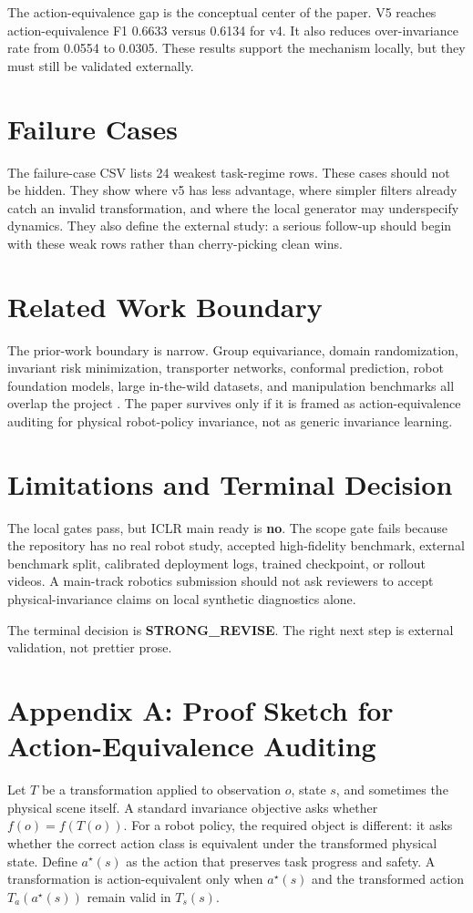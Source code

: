 \documentclass{article}
\begin{document}
The action-equivalence gap is the conceptual center of the paper. V5 reaches action-equivalence F1 0.6633 versus 0.6134 for v4. It also reduces over-invariance rate from 0.0554 to 0.0305. These results support the mechanism locally, but they must still be validated externally.

\section{Failure Cases}
The failure-case CSV lists 24 weakest task-regime rows. These cases should not be hidden. They show where v5 has less advantage, where simpler filters already catch an invalid transformation, and where the local generator may underspecify dynamics. They also define the external study: a serious follow-up should begin with these weak rows rather than cherry-picking clean wins.

\section{Related Work Boundary}
The prior-work boundary is narrow. Group equivariance, domain randomization, invariant risk minimization, transporter networks, conformal prediction, robot foundation models, large in-the-wild datasets, and manipulation benchmarks all overlap the project \citep{james2020rlbench,yu2020metaworld,ebert2021bridge}. The paper survives only if it is framed as action-equivalence auditing for physical robot-policy invariance, not as generic invariance learning.

\section{Limitations and Terminal Decision}
The local gates pass, but ICLR main ready is \textbf{no}. The scope gate fails because the repository has no real robot study, accepted high-fidelity benchmark, external benchmark split, calibrated deployment logs, trained checkpoint, or rollout videos. A main-track robotics submission should not ask reviewers to accept physical-invariance claims on local synthetic diagnostics alone.

The terminal decision is \textbf{STRONG\_REVISE}. The right next step is external validation, not prettier prose.

\clearpage

\section{Appendix A: Proof Sketch for Action-Equivalence Auditing}
Let $T$ be a transformation applied to observation $o$, state $s$, and sometimes the physical scene itself. A standard invariance objective asks whether $f(o)=f(T(o))$. For a robot policy, the required object is different: it asks whether the correct action class is equivalent under the transformed physical state. Define $a^\star(s)$ as the action that preserves task progress and safety. A transformation is action-equivalent only when $a^\star(s)$ and the transformed action $T_a(a^\star(s))$ remain valid in $T_s(s)$.
\end{document}
